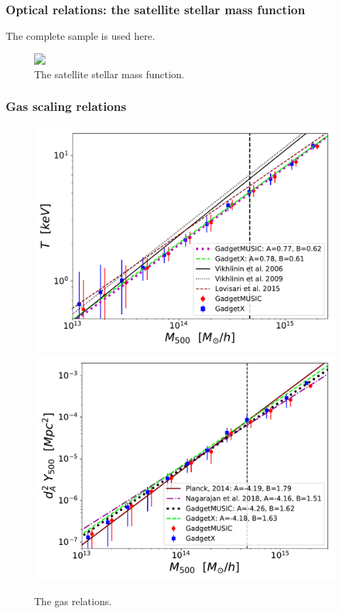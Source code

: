 \documentclass[aspectratio=43]{beamer}
\begin{document}
\begin{frame}
  \frametitle{Optical relations: the satellite stellar mass function}
  The complete sample is used here.
  \begin{figure}
    \includegraphics<1>[width=0.7\linewidth]{Ssmf}
    \vspace{-0.6cm}
    \caption{The satellite stellar mass function.  }
  \end{figure}
\end{frame}

\begin{frame}
  \frametitle{Gas scaling relations}
  \begin{figure}
    \includegraphics[width=0.48\linewidth]{T-M-relations}
    \includegraphics[width=0.48\linewidth]{YM_relation}
    \vspace{-0.4cm}
    \caption{The gas relations.  }
  \end{figure}
\end{frame}
\end{document}
